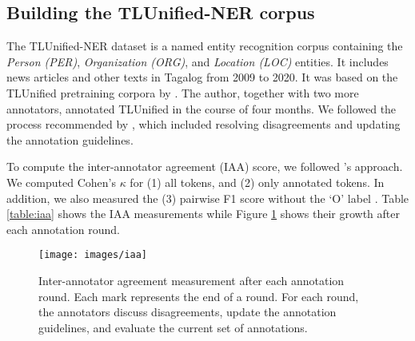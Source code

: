 \documentclass[11pt]{article}
\begin{document}
\subsection{Building the TLUnified-NER corpus}

The TLUnified-NER dataset is a named entity recognition corpus containing the \textit{Person (PER)}, \textit{Organization (ORG)}, and \textit{Location  (LOC)} entities.
It includes news articles and other texts in Tagalog from 2009 to 2020.
It was based on the TLUnified pretraining corpora by \cite{Cruz2021ImprovingLL}.
The author, together with two more annotators, annotated TLUnified in the course of four months.
We followed the process recommended by \citet{Reiter2017HT}, which included resolving disagreements and updating the annotation guidelines.

To compute the inter-annotator agreement (IAA) score, we followed \citet{Brandsen2020CreatingAD}'s approach.
We computed Cohen's $\kappa$ for (1) all tokens, and (2) only annotated tokens.  
In addition, we also measured the (3) pairwise F1 score without the `O' label \citep{Deleger2012BG}.
Table \ref{table:iaa} shows the IAA measurements while Figure \ref{fig:iaa} shows their growth after each annotation round.

\begin{figure}[t]
\centering
\texttt{[image: images/iaa]}
\caption{
  Inter-annotator agreement measurement after each annotation round.
  Each mark represents the end of a round. 
  For each round, the annotators discuss disagreements, update the annotation guidelines, and evaluate the current set of annotations.
}
\label{fig:iaa}
\end{figure}
\end{document}
